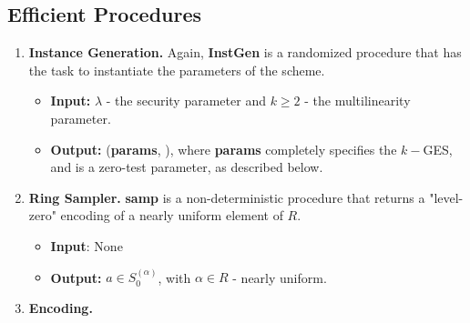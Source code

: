 \subsection{Efficient Procedures}
\begin{enumerate}[label=(\alph*)]
	\item \textbf{Instance Generation.}	 Again, \textbf{InstGen} is a randomized procedure that has the task to instantiate the parameters of the scheme.
	\begin{itemize}
		\item \textbf{Input:} $\lambda $ - the security parameter and $k \geq 2$ - the multilinearity parameter.
		\item \textbf{Output:} (\textbf{params}, \pzt), where \textbf{params} completely specifies the $k-$GES, and {\pzt}  is a zero-test parameter, as described below.
	\end{itemize}

	\newpage
	\item \textbf{Ring Sampler.} \textbf{samp} is a non-deterministic procedure that returns a "level-zero" encoding of a nearly uniform element of $R$.
		\begin{itemize}
		\item \textbf{Input}: None
		\item \textbf{Output:} $a\in S_0^{(\alpha)}$, with $\alpha\in R$ - nearly uniform.
	\end{itemize}

	\item \textbf{Encoding.} 
\end{enumerate}
